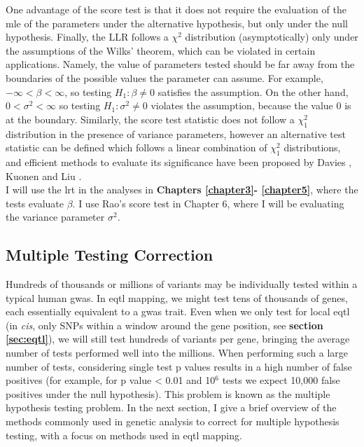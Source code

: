 One
advantage of the score test is that it does not require the evaluation of the \gls{mle} of the parameters under the alternative hypothesis, but only under the null hypothesis.
Finally, the $\mathrm{LLR}$ follows a $\chi^2$ distribution (asymptotically) only under the assumptions of the Wilks' theorem, which can be violated in certain applications.
Namely, the value of parameters tested should be far away from the boundaries of the possible values the parameter can assume.
For example, $-\infty < \beta < \infty$, so testing $H_1: \beta \neq 0$ satisfies the assumption.
On the other hand, $0 < \sigma^2 < \infty$ so testing $H_1: \sigma^2 \neq 0$ violates the assumption, because the value $0$ is at the boundary.
Similarly, the score test statistic does not follow a $\chi^2_1$ distribution in the presence of variance parameters, however an alternative test statistic can be defined which follows a linear combination of $\chi^2_1$ distributions, and efficient methods to evaluate its significance have been proposed by Davies \cite{davies1980algorithm}, Kuonen \cite{kuonen1999miscellanea} and Liu \cite{liu2009new, lee2012optimal}. \\

I will use the \gls{lrt} in the analyses in \textbf{Chapters 
\ref{chapter3}-
\ref{chapter5}}, where the tests evaluate $\beta$.
I use Rao's score test in Chapter 6, where I will be evaluating the variance parameter $\sigma^2$.


\subsection{Multiple Testing Correction}
\label{sec:multiple_testing}

Hundreds of thousands or millions of variants may be individually tested within a typical human \gls{gwas}. 
In e\gls{qtl} mapping, we might test tens of thousands of genes, each essentially equivalent to a \gls{gwas} trait. 
Even when we only test for local e\gls{qtl} (in \textit{cis}, only SNPs within a window around the gene position, see \textbf{section \ref{sec:eqtl}}), we will still test hundreds of variants per gene, bringing the average number of tests performed well into the millions.
When performing such a large number of tests, considering single test p values results in a high number of false positives (for example, for p value < 0.01 and 10$^6$ tests we expect 10,000 false positives under the null hypothesis). 
This problem is known as the multiple hypothesis testing problem. 
In the next section, I give a brief overview of the methods commonly used in genetic analysis to correct for multiple hypothesis testing, with a focus on methods used in e\gls{qtl} mapping.

